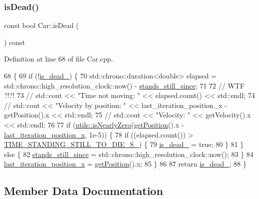 \subsubsection{\texorpdfstring{is\+Dead()}{isDead()}}
{\footnotesize\ttfamily const bool Car\+::is\+Dead (\begin{DoxyParamCaption}{ }\end{DoxyParamCaption}) const}



Definition at line 68 of file Car.\+cpp.


\begin{DoxyCode}
68                              \{
69     \textcolor{keywordflow}{if} (!\hyperlink{classCar_a73e9873dd2c3c0ab7bbd6623ac9085a8}{is\_dead\_}) \{
70         std::chrono::duration<double> elapsed = std::chrono::high\_resolution\_clock::now() - 
      \hyperlink{classCar_a164067ddfd603614a22d9c178bfa6308}{stands\_still\_since};
71 
72         \textcolor{comment}{// WTF ?!?!}
73 \textcolor{comment}{//        std::cout << "Time not moving: " << elapsed.count() << std::endl;}
74 \textcolor{comment}{//        std::cout << "Velocity by position: " << last\_iteration\_position\_x - getPosition().x <<
       std::endl;}
75 \textcolor{comment}{//        std::cout << "Velocity: " << getVelocity().x << std::endl;}
76 
77         \textcolor{keywordflow}{if} (\hyperlink{namespaceutils_a1fe70cdae64372e591da8985d7a884d6}{utils::isNearlyZero}(\hyperlink{classCar_aedf5fdf009d300cd2dc7faa51f30224b}{getPosition}().x - 
      \hyperlink{classCar_ac74055f1a48feb09e7c15714125ee190}{last\_iteration\_position\_x}, 1e-5)) \{
78             \textcolor{keywordflow}{if} ((elapsed.count()) > \hyperlink{classCar_aa988813339e3a1a8484484ac74b3d4e0}{TIME\_STANDING\_STILL\_TO\_DIE\_S\_}) \{
79                 \hyperlink{classCar_a73e9873dd2c3c0ab7bbd6623ac9085a8}{is\_dead\_} = \textcolor{keyword}{true};
80             \}
81         \} \textcolor{keywordflow}{else} \{
82             \hyperlink{classCar_a164067ddfd603614a22d9c178bfa6308}{stands\_still\_since} = std::chrono::high\_resolution\_clock::now();
83         \}
84         \hyperlink{classCar_ac74055f1a48feb09e7c15714125ee190}{last\_iteration\_position\_x} = \hyperlink{classCar_aedf5fdf009d300cd2dc7faa51f30224b}{getPosition}().x;
85     \}
86 
87     \textcolor{keywordflow}{return} \hyperlink{classCar_a73e9873dd2c3c0ab7bbd6623ac9085a8}{is\_dead\_};
88 \}
\end{DoxyCode}


\subsection{Member Data Documentation}
\mbox{\label{classCar_a6a0d40752a134fb4f0693a28a4e64a0d}} 
